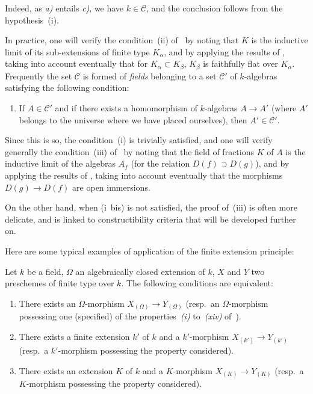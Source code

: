 Indeed, as \emph{a)} entails \emph{c)}, we have $k\in\mathcal{C}$, and the conclusion follows from the hypothesis~(i).

\begin{remark}[9.1.3]
\label{IV.9.1.3}
In practice, one will verify the condition~(ii) of~ by noting that $K$ is the inductive limit of its sub-extensions of finite type $K_\alpha$, and by applying the results of , taking into account eventually that for $K_\alpha\subset K_\beta$, $K_\beta$ is faithfully flat over $K_\alpha$.
Frequently the set $\mathcal{C}$ is formed of \emph{fields} belonging to a set $\mathcal{C}'$ of $k$-algebras satisfying the following condition:
\begin{enumerate}[label=(\roman*~bis)]
  \item If $A\in\mathcal{C}'$ and if there exists a homomorphism of $k$-algebras $A\to A'$ (where $A'$ belongs to the universe where we have placed ourselves), then $A'\in\mathcal{C}'$.
\end{enumerate}
\end{remark}

Since this is so, the condition~(i) is trivially satisfied, and one will verify generally the condition~(iii) of~ by noting that the field of fractions $K$ of $A$ is the inductive limit of the algebras $A_f$ (for the relation $D(f)\supset D(g)$), and by applying the results of , taking into account eventually that the morphisms $D(g)\to D(f)$ are open immersions.

On the other hand, when (i~bis) is not satisfied, the proof of~(iii) is often more delicate, and is linked to constructibility criteria that will be developed further on.

Here are some typical examples of application of the finite extension principle:

\begin{proposition}[9.1.4]
\label{IV.9.1.4}
Let $k$ be a field, $\Omega$ an algebraically closed extension of $k$, $X$ and $Y$ two preschemes of finite type over $k$.
The following conditions are equivalent:
\begin{enumerate}[label=\emph{\alph*)}]
  \item There exists an $\Omega$-morphism $X_{(\Omega)}\to Y_{(\Omega)}$ \textnormal{(}resp.\ an $\Omega$-morphism possessing one (specified) of the properties~\emph{(i)} to~\emph{(xiv)} of~\textnormal{)}.
  \item There exists a finite extension $k'$ of $k$ and a $k'$-morphism $X_{(k')}\to Y_{(k')}$ \textnormal{(}resp.\ a $k'$-morphism possessing the property considered\textnormal{)}.
  \item There exists an extension $K$ of $k$ and a $K$-morphism $X_{(K)}\to Y_{(K)}$ \textnormal{(}resp.\ a $K$-morphism possessing the property considered\textnormal{)}.
\end{enumerate}
\end{proposition}

